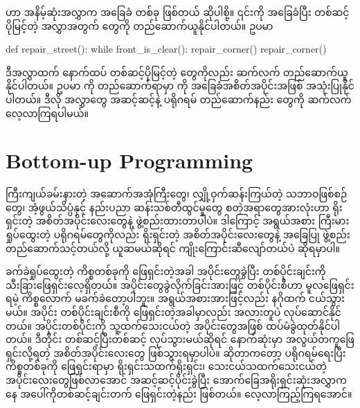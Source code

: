  ဟာ အနိမ့်ဆုံးအလွှာက အခြေခံ  တစ်ခု ဖြစ်တယ် ဆိုပါစို့။ ၎င်းကို အခြေခံပြီး တစ်ဆင့်ပိုမြင့်တဲ့ အလွှာအတွက်  တွေကို တည်ဆောက်ယူနိုင်ပါတယ်။ ဥပမာ
%
\begin{py}
def repair_street():
    while front_is_clear():
        repair_corner()
    repair_corner()
\end{py}
%
ဒီအလွှာထက် နောက်ထပ် တစ်ဆင့်ပိုမြင့်တဲ့  တွေကိုလည်း ဆက်လက် တည်ဆောက်ယူနိုင်ပါတယ်။ ဥပမာ  ကို တည်ဆောက်ရာမှာ  ကို အခြေခံအစိတ်အပိုင်းအဖြစ် အသုံးပြုနိုင်ပါတယ်။ ဒီလို  အလွှာတွေ အဆင့်ဆင့်နဲ့ ပရိုဂရမ် တည်ဆောက်နည်း တွေကို ဆက်လက်လေ့လာကြရပါမယ်။


\section{Bottom-up Programming}

ကြီးကျယ်ခမ်းနားတဲ့ အဆောက်အအုံကြီးတွေ၊ လျှို့ဝှက်ဆန်းကြယ်တဲ့ သဘာဝဖြစ်စဉ်တွေ၊ အံ့ဖွယ်သိပ္ပံနှင့် နည်းပညာ ဆန်းသစ်တီထွင်မှုတွေ စတဲ့အရာတွေအားလုံးဟာ ရိုးရှင်းတဲ့ အစိတ်အပိုင်းလေးတွေနဲ့ ဖွဲ့စည်းထားတာပါပဲ။ ဒါကြောင့် အရွယ်အစား ကြီးမား ရှုပ်ထွေးတဲ့ ပရိုဂရမ်တွေကိုလည်း ရိုးရှင်းတဲ့ အစိတ်အပိုင်းလေးတွေနဲ့ အခြေပြု ဖွဲ့စည်းတည်ဆောက်သင့်တယ်လို့ ယူဆမယ်ဆိုရင် ကျိုးကြောင်းဆီလျော်တယ်ပဲ ဆိုရမှာပါ။

ခက်ခဲရှုပ်ထွေးတဲ့ ကိစ္စတစ်ခုကို ဖြေရှင်းတဲ့အခါ အပိုင်းတွေခွဲပြီး တစ်ပိုင်းချင်းကို သီးခြားဖြေရှင်းလေ့ရှိတယ်။ အပိုင်းတွေခွဲလိုက်ခြင်းအားဖြင့် တစ်ပိုင်းစီဟာ မူလဖြေရှင်းရမဲ့ ကိစ္စလောက် မခက်ခဲတော့ပါဘူး။ အရွယ်အစားအားဖြင့်လည်း နဂိုထက် ငယ်သွားမယ်။ အပိုင်း တစ်ပိုင်းချင်းစီကို ဖြေရှင်းတဲ့အခါမှာလည်း အလားတူပဲ လုပ်ဆောင်နိုင်တယ်။ အပိုင်းတစ်ပိုင်းကို သူ့ထက်သေးငယ်တဲ့ အပိုင်းတွေအဖြစ် ထပ်မံခွဲထုတ်နိုင်ပါတယ်။ ဒီတိုင်း တစ်ဆင့်ပြီးတစ်ဆင့် လုပ်သွားမယ်ဆိုရင် နောက်ဆုံးမှာ အလွယ်တကူဖြေရှင်းလို့ရတဲ့ အစိတ်အပိုင်းလေးတွေ ဖြစ်သွားရမှာပါပဲ။  ဆိုတာကတော့ ပရိုဂရမ်ရေးပြီး ကိစ္စတစ်ခုကို ဖြေရှင်းရာမှာ ရိုးရှင်းသထက်ရိုးရှင်း၊ သေးငယ်သထက်သေးငယ်တဲ့ အပိုင်းလေးတွေဖြစ်လာအောင် အဆင့်ဆင့်ပိုင်းခွဲပြီး အောက်ခြေအရိုးရှင်းဆုံးအလွှာကနေ အပေါ်ကိုတစ်ဆင့်ချင်းတက် ဖြေရှင်းတဲ့နည်း ဖြစ်တယ်။ လေ့လာကြည့်ကြရအောင်။

